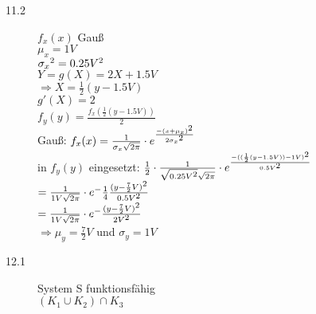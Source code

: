 \documentclass[a4paper]{article}
\begin{document}
\begin{description}
\begin{itemize}
	\end{itemize}
	
\item[11.2] $f_x(x)$ Gauß\\
						$\mu_x =1V$\\
						$\sigma_x\textsuperscript{2}= 0.25 V\textsuperscript{2}$\\
						
						$Y=g(X)=2X + 1.5V$\\
						$\Rightarrow X=\frac{1}{2} (y-1.5V)$\\
						$g'(X)=2$\\
						
						$f_y(y)= \frac{f_x (\frac{1}{2}(y-1.5V))}{2}$\\
						
						Gauß: $f_x(x)= \frac{1}{\sigma_x \sqrt{2\pi}} \cdot e^{\frac{-(x+\mu_x)\textsuperscript{2}}{2\sigma_x \textsuperscript{2}}}$\\
						in $f_y(y)$ eingesetzt: $\frac{1}{2} \cdot \frac{1}{\sqrt{0.25V\textsuperscript{2}}\sqrt{2\pi}} \cdot e^{\frac{-((\frac{1}{2}(y-1.5V))-1V) \textsuperscript{2}}{0.5V\textsuperscript{2}}}$\\
						$=\frac{1}{1V \sqrt{2\pi}} \cdot e^-\frac{1}{4}{\frac{(y-\frac{7}{2}V)\textsuperscript{2}}{0.5V\textsuperscript{2}}}$\\
						$=\frac{1}{1V \sqrt{2\pi}} \cdot e^-{\frac{(y-\frac{7}{2}V)\textsuperscript{2}}{2V\textsuperscript{2}}}$\\
						$\Rightarrow \mu_y= \frac{7}{2}V$ und $\sigma_y= 1V$\\
						
\item[12.1] System S funktionsfähig\\
						$(K_1 \cup K_2) \cap K_3$\\
						

\end{description}
\end{document}
